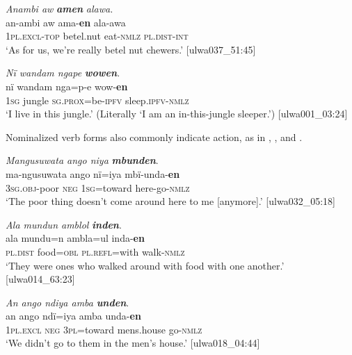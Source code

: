 \ea%
    \label{ex:nouns:30}
          \textit{Anambi aw} \textbf{\textit{amen}} \textit{alawa.}\\
\gll    an-ambi     aw       ama-\textbf{en}   ala{}-awa\\
    1\textsc{pl.excl-top}  betel.nut  eat-\textsc{nmlz}  \textsc{pl.dist-int}\\
\glt `As for us, we’re really betel nut chewers.’ [ulwa037\_51:45]
\z

\ea%
    \label{ex:nouns:31}
          \textit{Nï wandam ngape} \textbf{\textit{wowen}}.\\
\gll nï    wandam  nga=p-e      wow{}-\textbf{en}\\
    1\textsc{sg}  jungle    \textsc{sg.prox=}be\textsc{{}-ipfv} sleep.\textsc{ipfv}{}-\textsc{nmlz}\\
\glt `I live in this jungle.’ (Literally ‘I am an in-this-jungle sleeper.’) [ulwa001\_03:24]
\z

Nominalized verb forms also commonly indicate  action, as in , , and .

\ea%
    \label{ex:nouns:32}
          \textit{Mangusuwata ango niya} \textbf{\textit{mbunden}}.\\
\gll ma-ngusuwata  ango  nï=iya      mbï-unda-\textbf{en}\\
    3\textsc{sg.obj{}-}poor  \textsc{neg}  1\textsc{sg}=toward  here-go-\textsc{nmlz}\\
\glt `The poor thing doesn’t come around here to me [anymore].’ [ulwa032\_05:18]
\z



\ea%
    \label{ex:nouns:33}
          \textit{Ala mundun amblol} \textbf{\textit{inden}}.\\
\gll ala       mundu=n  ambla=ul    inda-\textbf{en}\\
    \textsc{pl.dist}  food=\textsc{obl}  \textsc{pl.refl=}with  walk-\textsc{nmlz}\\
\glt `They were ones who walked around with food with one another.’ [ulwa014\_63:23]
\z

\ea%
    \label{ex:nouns:34}
          \textit{An ango ndiya amba} \textbf{\textit{unden}}.\\
\gll an      ango  ndï=iya    amba       unda-\textbf{en}\\
    1\textsc{pl.excl}  \textsc{neg}  3\textsc{pl=}toward  mens.house  go-\textsc{nmlz}\\
\glt `We didn’t go to them in the men’s house.’ [ulwa018\_04:44]
\z

